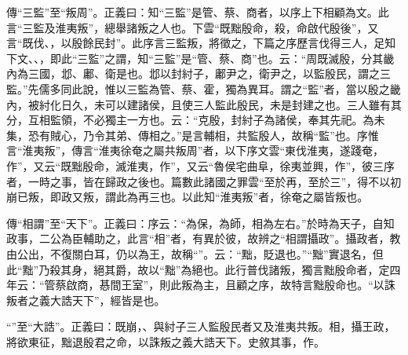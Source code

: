 {\noindent\zhuan{}\fzbyks 傳“三監”至“叛周”。正義曰：知“三監”是管、蔡、商者，以序上下相顧為文。此言“三監及淮夷叛”，總舉諸叛之人也。下雲“既黜殷命，殺，命啟代殷後”，又言“既伐、，以殷餘民封”。此序言三監叛，將徵之，下篇之序歷言伐得三人，足知下文、、，即此“三監”之謂，知“三監”是“管、蔡、商”也。云：“周既滅殷，分其畿內為三國，邶、鄘、衛是也。邶以封紂子，鄘尹之，衛尹之，以監殷民，謂之三監。”先儒多同此說，惟以三監為管、蔡、霍，獨為異耳。謂之“監”者，當以殷之畿內，被紂化日久，未可以建諸侯，且使三人監此殷民，未是封建之也。三人雖有其分，互相監領，不必獨主一方也。云：“克殷，封紂子為諸侯，奉其先祀。為未集，恐有賊心，乃令其弟、傳相之。”是言輔相，共監殷人，故稱“監”也。序惟言“淮夷叛”，傳言“淮夷徐奄之屬共叛周”者，以下序文雲“東伐淮夷，遂踐奄，作”，又云“既黜殷命，滅淮夷，作”，又云“魯侯宅曲阜，徐夷並興，作”，彼三序者，一時之事，皆在歸政之後也。篇數此諸國之罪雲“至於再，至於三”，得不以初崩已叛，即政又叛，謂此為再三也。以此知“淮夷叛”者，徐奄之屬皆叛也。 \par}

{\noindent\zhuan{}\fzbyks 傳“相謂”至“天下”。正義曰：序云：“為保，為師，相為左右。”於時為天子，自知政事，二公為臣輔助之，此言“相”者，有異於彼，故辨之“相謂攝政”。攝政者，教由公出，不復關白耳，仍以為王，故稱“”。云：“黜，貶退也。”“黜”實退名，但此“黜”乃殺其身，絕其爵，故以“黜”為絕也。此行普伐諸叛，獨言黜殷命者，定四年云：“管蔡啟商，惎間王室”，則此叛為主，且顧之序，故特言黜殷命也。“以誅叛者之義大誥天下”，經皆是也。 \par}

{\noindent\shu{}\fzkt “”至“大誥”。正義曰：既崩，、與紂子三人監殷民者又及淮夷共叛。相，攝王政，將欲東征，黜退殷君之命，以誅叛之義大誥天下。史敘其事，作。 \par}


